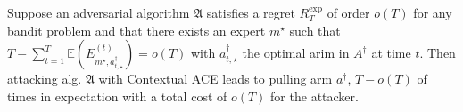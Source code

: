 
\begin{prop}\label{prop:rwd_attack_adv}
	Suppose an adversarial algorithm $\mathfrak{A}$ satisfies a regret $R_{T}^{\exp}$ of order $o(T)$ for any bandit problem and that there exists an expert $m^{\star}$ such that $ T - \sum_{t=1}^{T} \mathbb{E}\left(E^{(t)}_{m^{\star}, a_{t,\star}^{\dagger}}\right) = o(T)$ with $a_{t,\star}^{\dagger}$ the optimal arim in $A^{\dagger}$ at time $t$. Then attacking alg. $\mathfrak{A}$ with Contextual ACE leads to pulling arm $a^{\dagger}$, $T-o(T)$ of times in expectation with a total cost of $o(T)$ for the attacker.
\end{prop}

